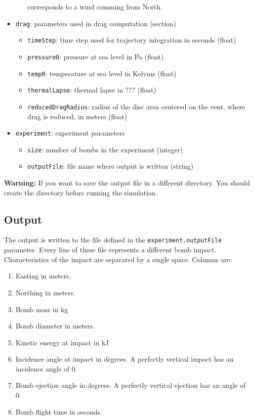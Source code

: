 \documentclass[10pt,a4paper]{article}
\begin{document}
\begin{itemize}
\begin{itemize}
corresponds to a wind comming from North.
\end{itemize}
\item \texttt{drag}: parameters used in drag computation (section)
\begin{itemize}
\item \texttt{timeStep}: time step used for trajectory integration in seconds (float)
\item \texttt{pressure0}: pressure at sea level in Pa (float)
\item \texttt{temp0}: temperature at sea level in Kelvins (float)
\item \texttt{thermalLapse}: thermal lapse in ??? (float)
\item \texttt{reducedDragRadius}: radius of the disc area centered on the vent,
where drag is reduced, in meters (float)
\end{itemize}
\item \texttt{experiment}: experiment parameters
\begin{itemize}
\item \texttt{size}: number of bombs in the experiment (integer)
\item \texttt{outputFile}: file name where output is written (string)
\end{itemize}
\end{itemize}

\textbf{Warning:} If you want to save the output file in a different
directory. You should create the directory before running the
simulation.

\subsection{Output}
\label{sec-5}

The output is written to the file defined in the
\texttt{experiment.outputFile} parameter. Every line of these file represents
a different bomb impact. Characteristics of the impact are separated by a single
space. Columns are:

\begin{enumerate}
\item Easting in meters.
\item Northing in meters.
\item Bomb mass in kg
\item Bomb diameter in meters.
\item Kinetic energy at impact in kJ
\item Incidence angle at impact in degrees. A perfectly vertical impact
has an incidence angle of 0.
\item Bomb ejection angle in degrees. A perfectly vertical ejection
has an angle of 0.
\item Bomb flight time in seconds.
\end{enumerate}
\end{document}
